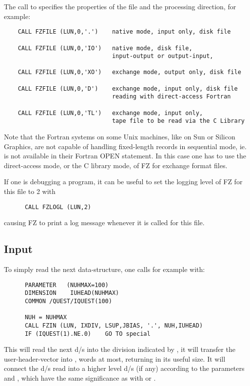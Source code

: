 The call to  specifies the properties of the file
and the processing direction, for example:
\begin{verbatim}
    CALL FZFILE (LUN,0,'.')    native mode, input only, disk file

    CALL FZFILE (LUN,0,'IO')   native mode, disk file,
                               input-output or output-input,

    CALL FZFILE (LUN,0,'XO')   exchange mode, output only, disk file

    CALL FZFILE (LUN,0,'D')    exchange mode, input only, disk file
                               reading with direct-access Fortran

    CALL FZFILE (LUN,0,'TL')   exchange mode, input only,
                               tape file to be read via the C Library

\end{verbatim}
Note that the Fortran systems on some Unix machines,
like on Sun or Silicon Graphics,
are not capable of handling fixed-length records in sequential mode,
ie.  is not available in their Fortran
OPEN statement.
In this case one has to use the direct-access mode,
or the C library mode, of FZ for exchange format files.

If one is debugging a program,
it can be useful to set the logging level of FZ for this file
to 2 with
\begin{verbatim}
      CALL FZLOGL (LUN,2)
\end{verbatim}
causing FZ to print a log message
whenever it is called for this file.

\subsection*{Input}

To simply read the next data-structure, one calls for example with:
\begin{verbatim}
      PARAMETER   (NUHMAX=100)
      DIMENSION    IUHEAD(NUHMAX)
      COMMON /QUEST/IQUEST(100)

      NUH = NUHMAX
      CALL FZIN (LUN, IXDIV, LSUP,JBIAS, '.', NUH,IUHEAD)
      IF (IQUEST(1).NE.0)    GO TO special
\end{verbatim}
This will read the next d/s into the division indicated by ,
it will transfer the user-header-vector into ,
 words at most, returning in  its useful size.
It will connect the d/s read into a higher level d/s (if any)
according to the parameters  and ,
which have the same significance as with  or .

